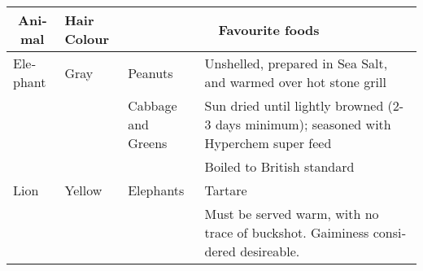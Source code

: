 \documentclass{article}
\begin{document}
\begin{latin}
\begin{tabularx}{\linewidth}{|l|p{1.25cm}|p{1.5cm}|X|}\hline
\multicolumn{1}{|c|}{\textbf{Animal}}
  & \textbf{Hair Colour}
  & \multicolumn{2}{c|}{\textbf{Favourite foods}} \\\hline\hline
Elephant & Gray & Peanuts
  & Unshelled, prepared in Sea Salt, and warmed over hot stone grill \\\cline{3-4}
  &  & Cabbage and Greens
  & Sun dried until lightly browned (2-3 days minimum); 
    seasoned with Hyperchem super feed \\\cline{4-4}
  & & & Boiled to British standard \\\hline\hline
Lion & Yellow & Elephants & Tartare \\\cline{4-4}
& & & Must be served warm, with no trace of 
  buckshot. Gaiminess considered desireable. \\\hline
\end{tabularx} 
\end{latin}
\end{document}
